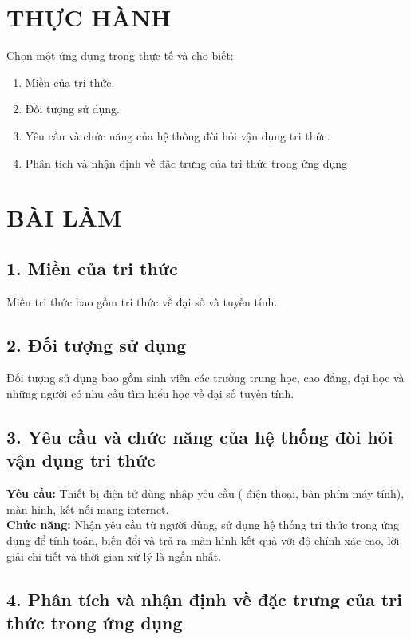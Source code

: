\documentclass[a4paper]{article}
\begin{document}
\section*{THỰC HÀNH}	
Chọn một ứng dụng trong thực tế và cho biết:

\begin{enumerate} 
	\item Miền của tri thức. 
	\item Đối tượng sử dụng. 
	\item Yêu cầu và chức năng của hệ thống đòi hỏi vận dụng tri thức. 
	\item Phân tích và nhận định về đặc trưng của tri thức trong ứng dụng
\end{enumerate}


\section*{BÀI LÀM}
		
\subsection* {1. Miền của tri thức}
Miền tri thức bao gồm tri thức về đại số và tuyến tính.

\subsection*{2. Đối tượng sử dụng}
Đối tượng sử dụng bao gồm sinh viên các trường trung học, cao đẳng, đại học và những người có nhu cầu tìm hiểu học về đại số tuyến tính.

\subsection*{3. Yêu cầu và chức năng của hệ thống đòi hỏi vận dụng tri thức}
\textbf{Yêu cầu: }Thiết bị điện tử dùng nhập yêu cầu ( điện thoại, bàn phím máy tính), màn hình, kết nối mạng internet.\\
\textbf{Chức năng: } Nhận yêu cầu từ người dùng, sử dụng hệ thống tri thức trong ứng dụng để tính toán, biến đổi và trả ra màn hình kết quả với độ chính xác cao, lời giải chi tiết và thời gian xử lý là ngắn nhất.

 \subsection*{4. Phân tích và nhận định về đặc trưng của tri thức trong ứng dụng}
\end{document}
